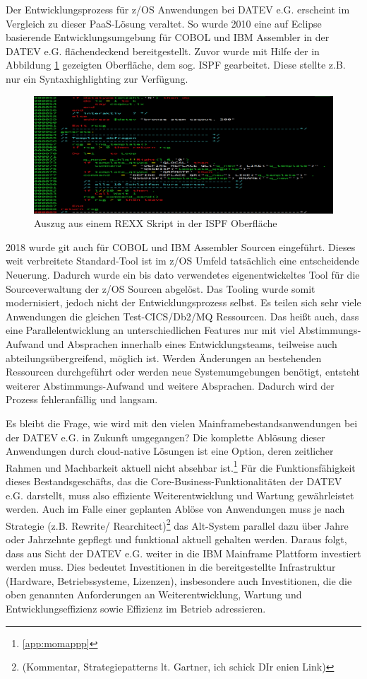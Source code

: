 Der Entwicklungsprozess für z/OS Anwendungen bei DATEV e.G. erscheint im Vergleich zu dieser PaaS-Lösung veraltet.
So wurde 2010 eine auf Eclipse basierende Entwicklungsumgebung für COBOL und IBM Assembler in der DATEV e.G. flächendeckend bereitgestellt.
Zuvor wurde mit Hilfe der in Abbildung \ref{fig:3270} gezeigten Oberfläche, dem sog. ISPF gearbeitet.
Diese stellte z.B. nur ein Syntaxhighlighting zur Verfügung.
\begin{figure}[h]
\centering
\includegraphics[width=\textwidth]{figures/rexxintso.png}
\caption{Auszug aus einem REXX Skript in der ISPF Oberfläche}
\label{fig:3270}
\end{figure}
2018 wurde git auch für COBOL und IBM Assembler Sourcen eingeführt.
Dieses weit verbreitete Standard-Tool ist im z/OS Umfeld tatsächlich eine entscheidende Neuerung.
Dadurch wurde ein bis dato verwendetes eigenentwickeltes Tool für die Sourceverwaltung der z/OS Sourcen abgelöst.
Das Tooling wurde somit modernisiert, jedoch nicht der Entwicklungsprozess selbst.
Es teilen sich sehr viele Anwendungen die gleichen Test-CICS/Db2/MQ Ressourcen.
Das heißt auch, dass eine Parallelentwicklung an unterschiedlichen Features nur mit viel Abstimmungs-Aufwand und Absprachen innerhalb eines Entwicklungsteams, teilweise auch abteilungsübergreifend, möglich ist.
Werden Änderungen an bestehenden Ressourcen durchgeführt oder werden neue Systemumgebungen benötigt, entsteht weiterer Abstimmungs-Aufwand und weitere Absprachen.
Dadurch wird der Prozess fehleranfällig und langsam.

Es bleibt die Frage, wie wird mit den vielen Mainframebestandsanwendungen bei der DATEV e.G. in Zukunft umgegangen?
Die komplette Ablösung dieser Anwendungen durch cloud-native Lösungen ist eine Option, deren zeitlicher Rahmen und Machbarkeit aktuell nicht absehbar ist.\footnote{\ref{app:momappp} }
Für die Funktionsfähigkeit dieses Bestandsgeschäfts, das die Core-Business-Funktionalitäten der DATEV e.G. darstellt, muss also effiziente Weiterentwicklung und Wartung gewährleistet werden.
Auch im Falle einer geplanten Ablöse von Anwendungen muss je nach Strategie (z.B. \glqq Rewrite\grqq / \glqq Rearchitect\grqq)\footnote{(Kommentar, Strategiepatterns lt. Gartner, ich schick DIr enien Link)} das Alt-System parallel dazu über Jahre oder Jahrzehnte gepflegt und funktional aktuell gehalten werden.
Daraus folgt, dass aus Sicht der DATEV e.G. weiter in die IBM Mainframe Plattform investiert werden muss. 
Dies bedeutet Investitionen in die bereitgestellte Infrastruktur (Hardware, Betriebssysteme, Lizenzen), insbesondere auch Investitionen, die die oben genannten Anforderungen an Weiterentwicklung, Wartung und Entwicklungseffizienz sowie Effizienz im Betrieb adressieren.

